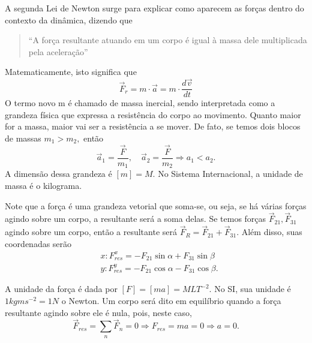 \documentclass{article}
\begin{document}
  A segunda Lei de Newton surge para explicar como aparecem as for\c cas dentro do contexto da din\^amica, dizendo que 
 \begin{quote}
    ``A for\c ca resultante atuando em um corpo \'e igual \`a massa dele multiplicada pela acelera\c c\~ao''
 \end{quote}
  Matematicamente, isto significa que 
    $$
    \boxed{\vec{F}_{r} = m \cdot \vec{a} = m \cdot \frac{d \vec{v}}{dt}}
    $$
  O termo novo m \'e chamado de massa inercial, sendo interpretada como a grandeza f\'isica que expressa a resist\^encia do corpo
ao movimento. Quanto maior for a massa, maior vai ser a resist\^encia a se mover. De fato, se temos dois blocos de massas $m_{1}>m_{2},$ ent\~ao 
  $$
    \vec{a}_{1} = \frac{\vec{F}}{m_{1}},\quad \vec{a}_{2} = \frac{\vec{F}}{m_{2}} \Rightarrow a_{1} < a_{2}.
  $$
  A dimens\~ao dessa grandeza \'e $[m] = M$. No Sistema Internacional, a unidade de massa \'e o kilograma.

  Note que a for\c ca \'e uma grandeza vetorial que soma-se, ou seja, se h\'a v\'arias for\c cas agindo sobre um corpo, a resultante ser\'a
  a soma delas. Se temos for\c cas $\vec{F}_{21}, \vec{F}_{31}$ agindo sobre um corpo, ent\~ao a resultante ser\'a $\vec{F}_{R} = \vec{F}_{21} + \vec{F}_{31}.$
  Al\'em disso, suas coordenadas ser\~ao 
 \begin{align*}
   &x: F_{res}^{x} = -F_{21}\sin{\alpha} + F_{31}\sin{\beta}\\
   &y: F_{res}^{y} = -F_{21}\cos{\alpha} - F_{31}\cos{\beta}.
 \end{align*}

 \begin{center}
  \end{center}
 A unidade da for\c ca \'e dada por $[F] = [ma] = MLT^{-2}$. No SI, sua unidade \'e $1kgms^{-2} = 1N$ o Newton.
 Um corpo ser\'a dito em equil\'ibrio quando a for\c ca resultante agindo sobre ele \'e nula, pois, neste caso, 
   $$
     \vec{F}_{res} = \sum\limits_{n}^{}\vec{F}_{n} = 0 \Rightarrow F_{res} = ma = 0 \Rightarrow a = 0.
   $$
\end{document}
